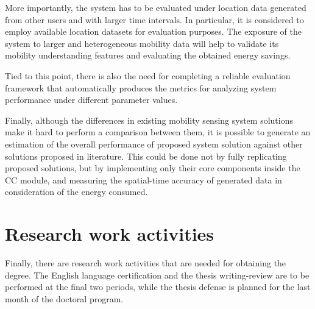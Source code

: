 \documentclass[10pt]{article}
\begin{document}
More importantly, the system has to be evaluated under location data generated from other users and with larger time intervals.
In particular, it is considered to employ available location datasets for evaluation purposes.
The exposure of the system to larger and heterogeneous mobility data will help to validate its mobility understanding features and evaluating the obtained energy savings.

Tied to this point, there is also the need for completing a reliable evaluation framework that automatically produces the metrics for analyzing system performance under different parameter values.

Finally, although the differences in existing mobility sensing system solutions make it hard to perform a comparison between them, it is possible to generate an estimation of the overall performance of proposed system solution against other solutions proposed in literature.
This could be done not by fully replicating proposed solutions, but by implementing only their core components inside the CC module, and measuring the spatial-time accuracy of generated data in consideration of the energy consumed.


\section{Research work activities}
Finally, there are research work activities that are needed for obtaining the degree.
The English language certification and the thesis writing-review are to be performed at the final two periods, while the thesis defense is planned for the last month of the doctoral program.
\end{document}
